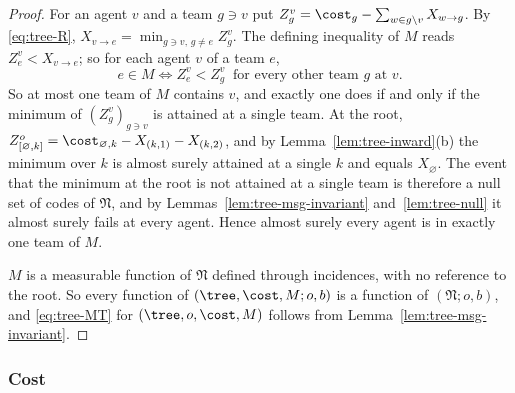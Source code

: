 \begin{proof}
For an agent $v$ and a team $g\ni v$ put $Z^v_g=\cost_g-\sum_{w\in g\setminus v}X_{w\to g}$. By
\eqref{eq:tree-R}, $X_{v\to e}=\min_{g\ni v,\,g\ne e}Z^v_g$. The defining inequality of $M$
reads $Z^v_e<X_{v\to e}$; so for each agent $v$ of a team $e$,
\begin{equation}\label{eq:tree-argmin}
  e\in M\iff Z^v_e<Z^v_g\ \text{ for every other team }g\text{ at }v .
\end{equation}
So at most one team of $M$ contains $v$, and exactly one does if and only if the minimum of
$(Z^v_g)_{g\ni v}$ is attained at a single team. At the root,
$Z^o_{[\varnothing,k]}=\cost_{\varnothing,k}-X_{(k,1)}-X_{(k,2)}$, and by
Lemma~\ref{lem:tree-inward}(b) the minimum over $k$ is almost surely attained at a single $k$
and equals $X_\varnothing$. The event that the minimum at the root is not attained at a single
team is therefore a null set of codes of $\mathfrak{N}$, and by
Lemmas~\ref{lem:tree-msg-invariant} and~\ref{lem:tree-null} it almost surely fails at every
agent. Hence almost surely every agent is in exactly one team of $M$.

$M$ is a measurable function of $\mathfrak{N}$ defined through incidences, with no reference
to the root. So every function of $(\tree,\cost,M;o,b)$ is a function of $(\mathfrak{N};o,b)$,
and \eqref{eq:tree-MT} for $(\tree,o,\cost,M)$ follows from
Lemma~\ref{lem:tree-msg-invariant}.
\end{proof}

\subsubsection*{Cost}

